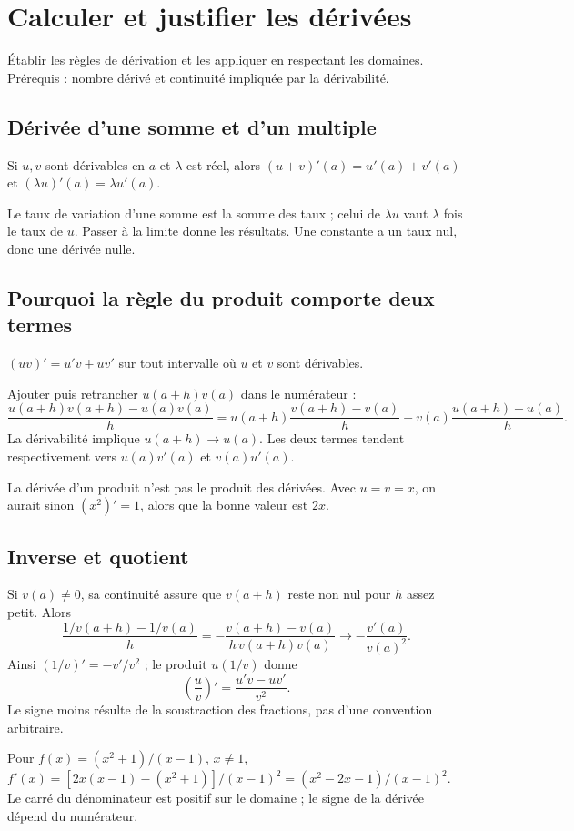 \documentclass[../cours_1re.tex]{subfiles}
\begin{document}
\setcounter{chapter}{8}
\chapter{Calculer et justifier les dérivées}
\label{ch:09}
\begin{objectif}
Établir les règles de dérivation et les appliquer en respectant les domaines. Prérequis : nombre dérivé et continuité impliquée par la dérivabilité.
\end{objectif}
\section{Dérivée d'une somme et d'un multiple}
Si $u,v$ sont dérivables en $a$ et $\lambda$ est réel, alors
$(u+v)'(a)=u'(a)+v'(a)$ et $(\lambda u)'(a)=\lambda u'(a)$.
\begin{demonstration}
Le taux de variation d'une somme est la somme des taux ; celui de $\lambda u$ vaut $\lambda$ fois le taux de $u$. Passer à la limite donne les résultats. Une constante a un taux nul, donc une dérivée nulle.
\end{demonstration}
\section{Pourquoi la règle du produit comporte deux termes}
\begin{theoreme}
$(uv)'=u'v+uv'$ sur tout intervalle où $u$ et $v$ sont dérivables.
\end{theoreme}
\begin{demonstration}
Ajouter puis retrancher $u(a+h)v(a)$ dans le numérateur :
\[
\frac{u(a+h)v(a+h)-u(a)v(a)}h
=u(a+h)\frac{v(a+h)-v(a)}h
+v(a)\frac{u(a+h)-u(a)}h.
\]
La dérivabilité implique $u(a+h)\to u(a)$. Les deux termes tendent respectivement vers $u(a)v'(a)$ et $v(a)u'(a)$.
\end{demonstration}
\begin{attention}
La dérivée d'un produit n'est pas le produit des dérivées. Avec $u=v=x$, on aurait sinon $(x^2)'=1$, alors que la bonne valeur est $2x$.
\end{attention}
\section{Inverse et quotient}
Si $v(a)\ne0$, sa continuité assure que $v(a+h)$ reste non nul pour $h$ assez petit. Alors
\[
\frac{1/v(a+h)-1/v(a)}h
=-\frac{v(a+h)-v(a)}{h\,v(a+h)v(a)}
\longrightarrow-\frac{v'(a)}{v(a)^2}.
\]
Ainsi $(1/v)'=-v'/v^2$ ; le produit $u(1/v)$ donne
\[
\left(\frac uv\right)'=\frac{u'v-uv'}{v^2}.
\]
Le signe moins résulte de la soustraction des fractions, pas d'une convention arbitraire.
\begin{exemple}
Pour $f(x)=(x^2+1)/(x-1)$, $x\ne1$,
$f'(x)=[2x(x-1)-(x^2+1)]/(x-1)^2=(x^2-2x-1)/(x-1)^2$.
Le carré du dénominateur est positif sur le domaine ; le signe de la dérivée dépend du numérateur.
\end{exemple}
\end{document}
